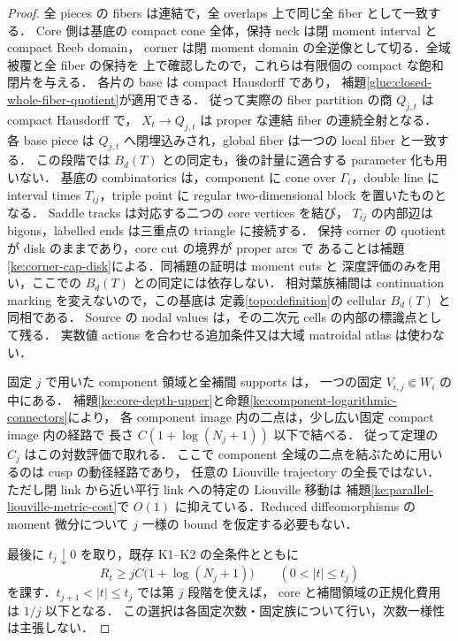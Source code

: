 \begin{proof}
全 pieces の fibers は連結で，全 overlaps 上で同じ全 fiber として一致する．
Core 側は基底の compact cone 全体，保持 neck は閉 moment interval と compact Reeb domain，
corner は閉 moment domain の全逆像として切る．全域被覆と全 fiber の保持を
上で確認したので，これらは有限個の compact な飽和閉片を与える．
各片の base は compact Hausdorff であり，
補題\ref{glue:closed-whole-fiber-quotient}が適用できる．
従って実際の fiber partition の商 $Q_{j,t}$ は compact Hausdorff で，
$X_t\to Q_{j,t}$ は proper な連結 fiber の連続全射となる．
各 base piece は $Q_{j,t}$ へ閉埋込みされ，global fiber は一つの local fiber と一致する．
この段階では $B_d(T)$ との同定も，後の計量に適合する parameter 化も用いない．
基底の combinatorics は，component に cone over $\Gamma_i$，double line に
interval times $T_{ij}$，triple point に regular two-dimensional block を置いたものとなる．
Saddle tracks は対応する二つの core vertices を結び，
$T_{ij}$ の内部辺は bigons，labelled ends は三重点の triangle に接続する．
保持 corner の quotient が disk のままであり，core cut の境界が proper arcs で
あることは補題\ref{ke:corner-cap-disk}による．同補題の証明は moment cuts と
深度評価のみを用い，ここでの $B_d(T)$ との同定には依存しない．
相対葉族補間は continuation marking を変えないので，この基底は
定義\ref{topo:definition}の cellular $B_d(T)$ と同相である．
Source の nodal values は，その二次元 cells の内部の標識点として残る．
実数値 actions を合わせる追加条件又は大域 matroidal atlas は使わない．

固定 $j$ で用いた component 領域と全補間 supports は，
一つの固定 $V_{i,j}\Subset W_i$ の中にある．
補題\ref{ke:core-depth-upper}と命題\ref{ke:component-logarithmic-connectors}により，
各 component image 内の二点は，少し広い固定 compact image 内の経路で
長さ $C(1+\log(N_j+1))$ 以下で結べる．
従って定理の $C_j$ はこの対数評価で取れる．
ここで component 全域の二点を結ぶために用いるのは cusp の動径経路であり，
任意の Liouville trajectory の全長ではない．
ただし閉 link から近い平行 link への特定の Liouville 移動は
補題\ref{ke:parallel-liouville-metric-cost}で $O(1)$ に抑えている．Reduced diffeomorphisms の moment 微分について
$j$ 一様の bound を仮定する必要もない．

最後に $t_j\downarrow0$ を取り，既存 K1--K2 の全条件とともに
\[
 R_t\ge jC\bigl(1+\log(N_j+1)\bigr)
 \qquad(0<|t|\le t_j)
\]
を課す．$t_{j+1}<|t|\le t_j$ では第 $j$ 段階を使えば，
core と補間領域の正規化費用は $1/j$ 以下となる．
この選択は各固定次数・固定族について行い，次数一様性は主張しない．
\end{proof}

